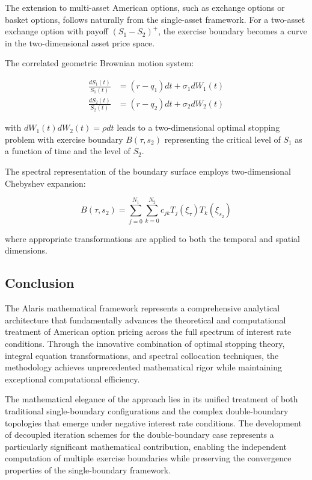 \documentclass[
  11pt,
  11pt,
  letterpaper,
  onecolumn]{article}
\begin{document}
The extension to multi-asset American options, such as exchange options
or basket options, follows naturally from the single-asset framework.
For a two-asset exchange option with payoff \((S_1 - S_2)^+\), the
exercise boundary becomes a curve in the two-dimensional asset price
space.

The correlated geometric Brownian motion system:

\[\begin{aligned}
\frac{dS_1(t)}{S_1(t)} &= (r-q_1)dt + \sigma_1 dW_1(t) \\
\frac{dS_2(t)}{S_2(t)} &= (r-q_2)dt + \sigma_2 dW_2(t)
\end{aligned} \tag{8.8}\]

with \(dW_1(t) dW_2(t) = \rho dt\) leads to a two-dimensional optimal
stopping problem with exercise boundary \(B(\tau,s_2)\) representing the
critical level of \(S_1\) as a function of time and the level of
\(S_2\).

The spectral representation of the boundary surface employs
two-dimensional Chebyshev expansion:

\[B(\tau,s_2) = \sum_{j=0}^{N_1} \sum_{k=0}^{N_2} c_{jk} T_j(\xi_\tau) T_k(\xi_{s_2}) \tag{8.9}\]

where appropriate transformations are applied to both the temporal and
spatial dimensions.

\subsection{Conclusion}\label{conclusion}

The Alaris mathematical framework represents a comprehensive analytical
architecture that fundamentally advances the theoretical and
computational treatment of American option pricing across the full
spectrum of interest rate conditions. Through the innovative combination
of optimal stopping theory, integral equation transformations, and
spectral collocation techniques, the methodology achieves unprecedented
mathematical rigor while maintaining exceptional computational
efficiency.

The mathematical elegance of the approach lies in its unified treatment
of both traditional single-boundary configurations and the complex
double-boundary topologies that emerge under negative interest rate
conditions. The development of decoupled iteration schemes for the
double-boundary case represents a particularly significant mathematical
contribution, enabling the independent computation of multiple exercise
boundaries while preserving the convergence properties of the
single-boundary framework.
\end{document}
